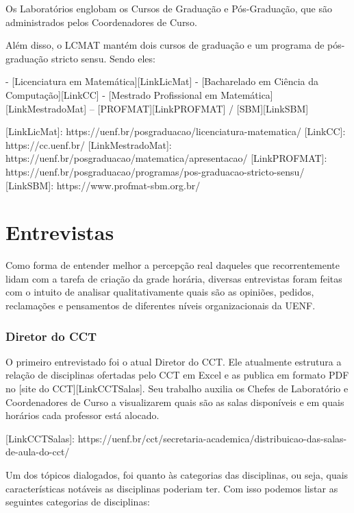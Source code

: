 Os Laboratórios englobam os Cursos de Graduação e Pós-Graduação, que são administrados pelos Coordenadores de Curso.

Além disso, o LCMAT mantém dois cursos de graduação e um programa de pós-graduação stricto sensu. Sendo eles:

- [Licenciatura em Matemática][LinkLicMat]
- [Bacharelado em Ciência da Computação][LinkCC]
- [Mestrado Profissional em Matemática][LinkMestradoMat] – [PROFMAT][LinkPROFMAT] / [SBM][LinkSBM]

[LinkLicMat]: https://uenf.br/posgraduacao/licenciatura-matematica/
[LinkCC]: https://cc.uenf.br/
[LinkMestradoMat]: https://uenf.br/posgraduacao/matematica/apresentacao/
[LinkPROFMAT]: https://uenf.br/posgraduacao/programas/pos-graduacao-stricto-sensu/
[LinkSBM]: https://www.profmat-sbm.org.br/

\section{Entrevistas} %


Como forma de entender melhor a percepção real daqueles que recorrentemente lidam com a tarefa de criação da grade horária, diversas entrevistas foram feitas com o intuito de analisar qualitativamente quais são as opiniões, pedidos, reclamações e pensamentos de diferentes níveis organizacionais da UENF.

\subsubsection{Diretor do CCT} %


O primeiro entrevistado foi o atual Diretor do CCT. Ele atualmente estrutura a relação de disciplinas ofertadas pelo CCT em Excel e as publica em formato PDF no [site do CCT][LinkCCTSalas]. Seu trabalho auxilia os Chefes de Laboratório e Coordenadores de Curso a visualizarem quais são as salas disponíveis e em quais horários cada professor está alocado.

[LinkCCTSalas]: https://uenf.br/cct/secretaria-academica/distribuicao-das-salas-de-aula-do-cct/

Um dos tópicos dialogados, foi quanto às categorias das disciplinas, ou seja, quais características notáveis as disciplinas poderiam ter. Com isso podemos listar as seguintes categorias de disciplinas:

